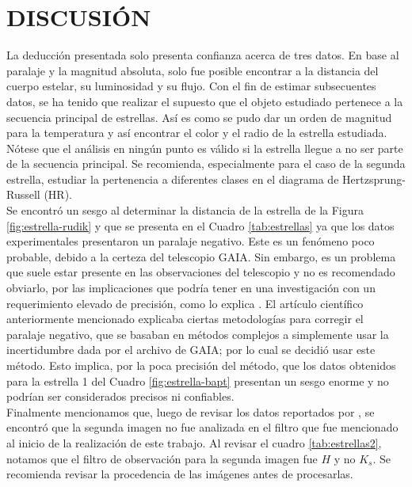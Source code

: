 \section*{DISCUSIÓN}\label{sec:discusion}

La deducción presentada solo presenta confianza acerca de tres datos. En base al paralaje y la magnitud absoluta, solo fue posible encontrar a la distancia del cuerpo estelar, su luminosidad y su flujo. Con el fin de estimar subsecuentes datos, se ha tenido que realizar el supuesto que el objeto estudiado pertenece a la secuencia principal de estrellas. Así es como se pudo dar un orden de magnitud para la temperatura y así encontrar el color y el radio de la estrella estudiada. Nótese que el análisis en ningún punto es válido si la estrella llegue a no ser parte de la secuencia principal. Se recomienda, especialmente para el caso de la segunda estrella, estudiar la pertenencia a diferentes clases en el diagrama de Hertzsprung-Russell (HR).\\

Se encontró un sesgo al determinar la distancia de la estrella de la Figura \ref{fig:estrella-rudik} y que se presenta en el Cuadro \ref{tab:estrellas} ya que los datos experimentales presentaron un paralaje negativo. Este es un fenómeno poco probable, debido a la certeza del telescopio GAIA. Sin embargo, es un problema que suele estar presente en las observaciones del telescopio y no es recomendado obviarlo, por las implicaciones que podría tener en una investigación con un requerimiento elevado de precisión, como lo explica \cite{gaia2018gaia}. El artículo científico anteriormente mencionado explicaba ciertas metodologías para corregir el paralaje negativo, que se basaban en métodos complejos a simplemente usar la incertidumbre dada por el archivo de GAIA; por lo cual se decidió usar este método. Esto implica, por la poca precisión del método, que los datos obtenidos para la estrella 1 del Cuadro \ref{fig:estrella-bapt} presentan un sesgo enorme y no podrían ser considerados precisos ni confiables.  \\

Finalmente mencionamos que, luego de revisar los datos reportados por \cite{lopez2019quiescent}, se encontró que la segunda imagen no fue analizada en el filtro que fue mencionado al inicio de la realización de este trabajo. Al revisar el cuadro \ref{tab:estrellas2}, notamos que el filtro de observación para la segunda imagen fue $H$ y no $K_s$. Se recomienda revisar la procedencia de las imágenes antes de procesarlas.